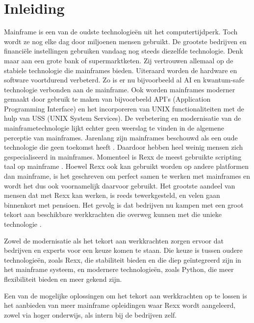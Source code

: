
\section{Inleiding}%
\label{sec:inleiding}


Mainframe is een van de oudste technologieën uit het computertijdperk. Toch wordt ze nog elke dag door miljoenen mensen gebruikt. De grootste bedrijven en financiële instellingen gebruiken vandaag nog steeds diezelfde technologie. Denk maar aan een grote bank of supermarktketen. Zij vertrouwen allemaal op de stabiele technologie die mainframes bieden. Uiteraard worden de hardware en software voortdurend verbeterd. Zo is er nu bijvoorbeeld al AI en kwantum-safe technologie verbonden aan de mainframe. Ook worden mainframes moderner gemaakt door gebruik te maken van bijvoorbeeld API's (Application Programming Interface) en het incorporeren van UNIX functionaliteiten met de hulp van USS (UNIX System Services). De verbetering en modernisatie van de mainframetechnologie lijkt echter geen weerslag te vinden in de algemene perceptie van mainframes. Jarenlang zijn mainframes beschouwd als een oude technologie die geen toekomst heeft \autocite{Sagers2018}. Daardoor hebben heel weinig mensen zich gespecialiseerd in mainframes. Momenteel is Rexx de meest gebruikte scripting taal op mainframe \autocite{Gilio2021}. Hoewel Rexx ook kan gebruikt worden op andere platformen dan mainframe, is het geschreven om perfect samen te werken met mainframes en wordt het dus ook voornamelijk daarvoor gebruikt. Het grootste aandeel van mensen dat met Rexx kan werken, is reeds tewerkgesteld, en velen gaan binnenkort met pensioen. Het gevolg is dat bedrijven nu kampen met een groot tekort aan beschikbare werkkrachten die overweg kunnen met die unieke technologie \autocite{NgoYe2018}.

Zowel de modernisatie als het tekort aan werkkrachten zorgen ervoor dat bedrijven en experts voor een keuze komen te staan. Die keuze is tussen oudere technologieën, zoals Rexx, die stabiliteit bieden en die diep geïntegreerd zijn in het mainframe systeem, en modernere technologieën, zoals Python, die meer flexibiliteit bieden en meer gekend zijn. 

Een van de mogelijke oplossingen om het tekort aan werkkrachten op te lossen is het aanbieden van meer mainframe opleidingen waar Rexx wordt aangeleerd, zowel via hoger onderwijs, als intern bij de bedrijven zelf. 

